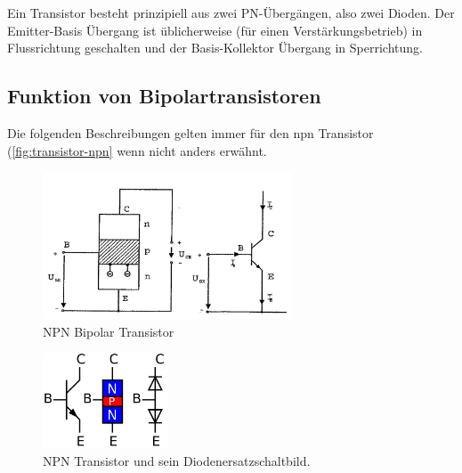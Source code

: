 
Ein Transistor besteht prinzipiell aus zwei PN-Übergängen, also zwei Dioden. 
Der Emitter-Basis Übergang ist üblicherweise (für einen Verstärkungsbetrieb) in Flussrichtung geschalten und der Basis-Kollektor Übergang in Sperrichtung. 

\subsection{Funktion von Bipolartransistoren }\label{k6:bipolar}
Die folgenden Beschreibungen gelten immer für den npn Transistor (\autoref{fig:transistor-npn} wenn nicht anders erwähnt.    
    \begin{figure}
        \centering
        \includegraphics[width=0.66\textwidth]{fig/npn-transistor}
        \caption{NPN Bipolar Transistor}
        \label{fig:transistor-npn}
    \end{figure}
    
    \begin{figure}
        \centering
        \includegraphics[width=0.33\textwidth]{fig/transistor-npn-diode.jpg}
        \caption{NPN Transistor und sein Diodenersatzschaltbild.}
        \label{fig:transistor-npn-diode}
    \end{figure}
    

